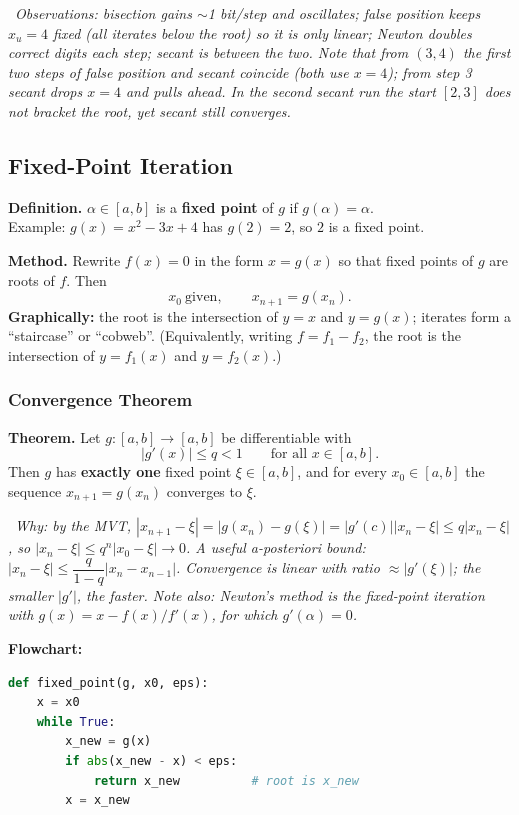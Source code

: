 \documentclass[hidelinks]{article}
\newcommand{\callout}[1]{\par\smallskip\noindent{\color{capri}$\blacktriangleright$}\ \textit{#1}\par\smallskip}
\newcommand{\abs}[1]{\left|#1\right|}
\begin{document}
\callout{Observations: bisection gains $\sim$1 bit/step and oscillates; false position keeps $x_u=4$ fixed (all iterates below the root) so it is only linear; Newton doubles correct digits each step; secant is between the two. Note that from $(3,4)$ the first two steps of false position and secant coincide (both use $x=4$); from step 3 secant drops $x=4$ and pulls ahead. In the second secant run the start $[2,3]$ does \emph{not} bracket the root, yet secant still converges.}

\subsection{Fixed-Point Iteration}

\textbf{Definition.} $\alpha\in[a,b]$ is a \textbf{fixed point} of $g$ if $g(\alpha)=\alpha$.\\
Example: $g(x)=x^2-3x+4$ has $g(2)=2$, so $2$ is a fixed point.

\textbf{Method.} Rewrite $f(x)=0$ in the form $x=g(x)$ so that fixed points of $g$ are roots of $f$. Then
\[
x_0\ \text{given},\qquad x_{n+1}=g(x_n).
\]
\textbf{Graphically:} the root is the intersection of $y=x$ and $y=g(x)$; iterates form a ``staircase'' or ``cobweb''. (Equivalently, writing $f=f_1-f_2$, the root is the intersection of $y=f_1(x)$ and $y=f_2(x)$.)

\subsubsection{Convergence Theorem}

\textbf{Theorem.} Let $g:[a,b]\to[a,b]$ be differentiable with
\[
\abs{g'(x)}\le q<1\qquad\text{for all }x\in[a,b].
\]
Then $g$ has \textbf{exactly one} fixed point $\xi\in[a,b]$, and for every $x_0\in[a,b]$ the sequence $x_{n+1}=g(x_n)$ converges to $\xi$.

\callout{Why: by the MVT, $\abs{x_{n+1}-\xi}=\abs{g(x_n)-g(\xi)}=\abs{g'(c)}\abs{x_n-\xi}\le q\abs{x_n-\xi}$, so $\abs{x_n-\xi}\le q^n\abs{x_0-\xi}\to0$. A useful a-posteriori bound: $\abs{x_n-\xi}\le\dfrac{q}{1-q}\abs{x_n-x_{n-1}}$. Convergence is linear with ratio $\approx\abs{g'(\xi)}$; the smaller $\abs{g'}$, the faster. Note also: Newton's method is the fixed-point iteration with $g(x)=x-f(x)/f'(x)$, for which $g'(\alpha)=0$.}

\textbf{Flowchart:}
\begin{lstlisting}[language=Python]
def fixed_point(g, x0, eps):
    x = x0
    while True:
        x_new = g(x)
        if abs(x_new - x) < eps:
            return x_new          # root is x_new
        x = x_new
\end{lstlisting}
\end{document}
